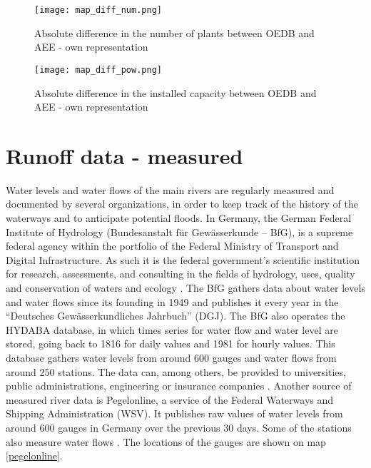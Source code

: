 \begin{figure}[H]
\texttt{[image: map\_diff\_num.png]}
\caption[Absolute difference in the number of plants between OEDB and AEE]{Absolute difference in the number of plants between OEDB and AEE - own representation}
\centering
\label{map_diff_num}
\end{figure}


\begin{figure}[H]
\texttt{[image: map\_diff\_pow.png]}
\caption[Absolute difference in the installed capacity between OEDB and AEE]{Absolute difference in the installed capacity between OEDB and AEE - own representation}
\centering
\label{map_diff_pow}
\end{figure}

\section{Runoff data - measured}

\label{meas_runoff}
Water levels and water flows of the main rivers are regularly measured and documented by several organizations, in order to keep track of the history of the waterways and to anticipate potential floods. In Germany, the German Federal Institute of Hydrology (Bundesanstalt für Gewässerkunde – BfG), is a supreme federal agency within the portfolio of the Federal Ministry of Transport and Digital Infrastructure. As such it is the federal government's scientific institution for research, assessments, and consulting in the fields of hydrology, uses, quality and conservation of waters and ecology \cite{bafg}. The BfG gathers data about water levels and water flows since its founding in 1949 and publishes it every year in the ``Deutsches Gewässerkundliches Jahrbuch'' (DGJ). The BfG also operates the HYDABA database, in which times series for water flow and water level are stored, going back to 1816 for daily values and 1981 for hourly values. This database gathers water levels from around 600 gauges and water flows from around 250 stations. The data can, among others, be provided to universities, public administrations, engineering or insurance companies \cite{bafg_hyd}. \newline
Another source of measured river data is Pegelonline, a service of the Federal Waterways and Shipping Administration (WSV). It publishes raw values of water levels from around 600 gauges in Germany over the previous 30 days. Some of the stations also measure water flows \cite{pegelonline}. The locations of the gauges are shown on map \ref{pegelonline}.

